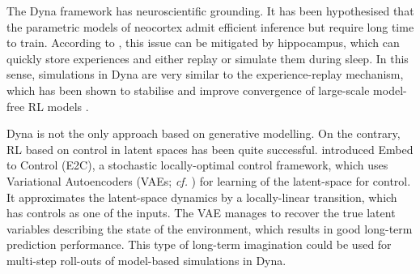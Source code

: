         The Dyna framework has neuroscientific grounding. It has been hypothesised that the parametric models of neocortex admit efficient inference but require long time to train. According to \cite{Kumaran2016}, this issue can be mitigated by hippocampus, which can quickly store experiences and either replay or simulate them during sleep. In this sense, simulations in Dyna are very similar to the experience-replay mechanism, which has been shown to stabilise and improve convergence of large-scale model-free RL models \citep{Mnih2015}.
        
        Dyna is not the only approach based on generative modelling. On the contrary, RL based on control in latent spaces has been quite successful. \cite{Watter2015} introduced Embed to Control (E2C), a stochastic locally-optimal control framework, which uses Variational Autoencoders (VAEs; \emph{cf.} ) for learning of the latent-space for control. It approximates the latent-space dynamics by a locally-linear transition, which has controls as one of the inputs. The VAE manages to recover the true latent variables describing the state of the environment, which results in good long-term prediction performance. This type of long-term imagination could be used for multi-step roll-outs of model-based simulations in Dyna.  

%
%   
